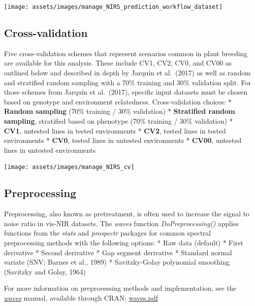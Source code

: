 \documentclass[
  12pt,
]{book}
\begin{document}
\begin{center}\texttt{[image: assets/images/manage\_NIRS\_prediction\_workflow\_dataset]} \end{center}

\hypertarget{cross-validation}{%
\subsection{Cross-validation}\label{cross-validation}}

Five cross-validation schemes that represent scenarios common in plant breeding are available for this analysis. These include CV1, CV2, CV0, and CV00 as outlined below and described in depth by Jarquín et al.~(2017) as well as random and stratified random sampling with a 70\% training and 30\% validation split. For those schemes from Jarquín et al.~(2017), specific input datasets must be chosen based on genotype and environment relatedness. Cross-validation choices: * \textbf{Random sampling} (70\% training / 30\% validation) * \textbf{Stratified random sampling}, stratified based on phenotype (70\% training / 30\% validation) * \textbf{CV1}, untested lines in tested environments * \textbf{CV2}, tested lines in tested environments * \textbf{CV0}, tested lines in untested environments * \textbf{CV00}, untested lines in untested environments

\begin{center}\texttt{[image: assets/images/manage\_NIRS\_cv]} \end{center}

\hypertarget{preprocessing}{%
\subsection{Preprocessing}\label{preprocessing}}

Preprocessing, also known as pretreatment, is often used to increase the signal to noise ratio in vis-NIR datasets. The \emph{waves} function \emph{DoPreprocessing()} applies functions from the \emph{stats} and \emph{prospectr} packages for common spectral preprocessing methods with the following options: * Raw data (default) * First derivative * Second derivative * Gap segment derivative * Standard normal variate (SNV; Barnes et al., 1989) * Savitzky-Golay polynomial smoothing (Savitzky and Golay, 1964)

For more information on preprocessing methods and implementation, see the \href{https://CRAN.R-project.org/package=waves}{\emph{waves}} manual, available through CRAN: \href{https://cran.r-project.org/web/packages/waves/waves.pdf}{waves.pdf}
\end{document}
